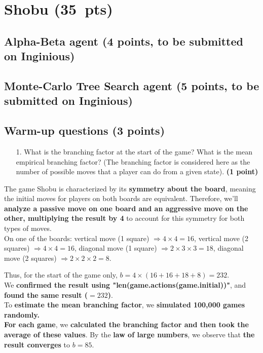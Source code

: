 \documentclass[11pt,a4paper]{report}
\begin{document}
\clearpage
\section{Shobu (35~pts)}
\medskip

\subsection{Alpha-Beta agent (4 points, to be submitted on Inginious)}
\medskip


\subsection{Monte-Carlo Tree Search agent (5 points, to be submitted on Inginious)}
\medskip


\subsection{Warm-up questions (3 points)}
\begin{enumerate}
\item[1.] What is the branching factor at the start of the game? What is the mean empirical branching factor? (The branching factor is considered here as the number of possible moves that a player can do from a given state). \textbf{(1 point)}
\end{enumerate}

\begin{answers}[5cm]
\small{The game Shobu is characterized by its \textbf{symmetry about the board}, meaning the initial moves for players on both boards are equivalent.
Therefore, we'll \textbf{analyze a passive move on one board and an aggressive move on the other, multiplying the result by 4} to account for this symmetry for both types of moves. \\

On one of the boards: vertical move (1 square) $\Rightarrow 4 \times 4 = 16$, vertical move (2 squares) $\Rightarrow 4 \times 4 = 16$, diagonal move (1 square) $\Rightarrow 2 \times 3 \times 3 = 18$, diagonal move (2 squares) $\Rightarrow 2 \times 2 \times 2 = 8$.

Thus, for the start of the game only, \textbf{$b = 4 \times (16 + 16 + 18 + 8) = 232$}. \\
We \textbf{confirmed the result using "len(game.actions(game.initial))"}, and \textbf{found the same result ($= 232$)}. \\

To \textbf{estimate the mean branching factor}, we \textbf{simulated 100,000 games randomly. \\
For each game}, we \textbf{calculated the branching factor and then took the average of these values}. By the \textbf{law of large numbers}, we observe that \textbf{the result converges} to \textbf{$b = 85$}.}

\end{answers}
\end{document}
